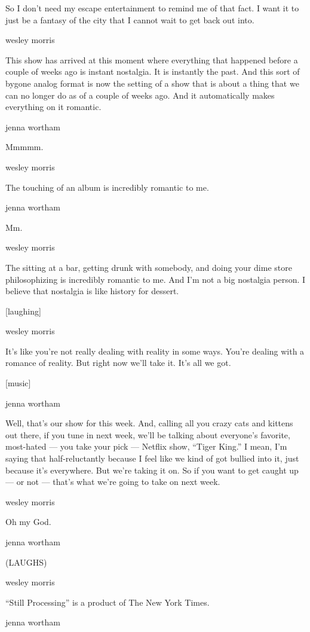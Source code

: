 So I don't need my escape entertainment to remind me of that fact. I
want it to just be a fantasy of the city that I cannot wait to get back
out into.

wesley morris

This show has arrived at this moment where everything that happened
before a couple of weeks ago is instant nostalgia. It is instantly the
past. And this sort of bygone analog format is now the setting of a show
that is about a thing that we can no longer do as of a couple of weeks
ago. And it automatically makes everything on it romantic.

jenna wortham

Mmmmm.

wesley morris

The touching of an album is incredibly romantic to me.

jenna wortham

Mm.

wesley morris

The sitting at a bar, getting drunk with somebody, and doing your dime
store philosophizing is incredibly romantic to me. And I'm not a big
nostalgia person. I believe that nostalgia is like history for dessert.

{[}laughing{]}

wesley morris

It's like you're not really dealing with reality in some ways. You're
dealing with a romance of reality. But right now we'll take it. It's all
we got.

{[}music{]}

jenna wortham

Well, that's our show for this week. And, calling all you crazy cats and
kittens out there, if you tune in next week, we'll be talking about
everyone's favorite, most-hated --- you take your pick --- Netflix show,
``Tiger King.'' I mean, I'm saying that half-reluctantly because I feel
like we kind of got bullied into it, just because it's everywhere. But
we're taking it on. So if you want to get caught up --- or not ---
that's what we're going to take on next week.

wesley morris

Oh my God.

jenna wortham

(LAUGHS)

wesley morris

``Still Processing'' is a product of The New York Times.

jenna wortham

